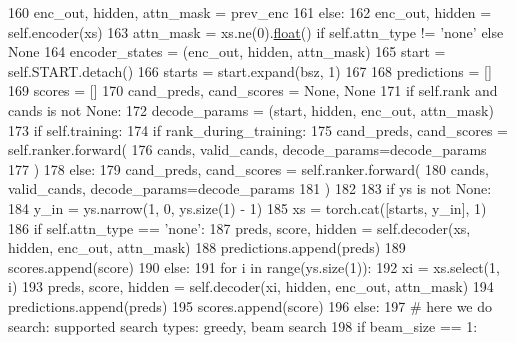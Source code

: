 \begin{DoxyCode}
160             enc\_out, hidden, attn\_mask = prev\_enc
161         \textcolor{keywordflow}{else}:
162             enc\_out, hidden = self.encoder(xs)
163             attn\_mask = xs.ne(0).\hyperlink{namespaceprojects_1_1controllable__dialogue_1_1make__control__dataset_aa2b7207688c641dbc094ab44eca27113}{float}() \textcolor{keywordflow}{if} self.attn\_type != \textcolor{stringliteral}{'none'} \textcolor{keywordflow}{else} \textcolor{keywordtype}{None}
164         encoder\_states = (enc\_out, hidden, attn\_mask)
165         start = self.START.detach()
166         starts = start.expand(bsz, 1)
167 
168         predictions = []
169         scores = []
170         cand\_preds, cand\_scores = \textcolor{keywordtype}{None}, \textcolor{keywordtype}{None}
171         \textcolor{keywordflow}{if} self.rank \textcolor{keywordflow}{and} cands \textcolor{keywordflow}{is} \textcolor{keywordflow}{not} \textcolor{keywordtype}{None}:
172             decode\_params = (start, hidden, enc\_out, attn\_mask)
173             \textcolor{keywordflow}{if} self.training:
174                 \textcolor{keywordflow}{if} rank\_during\_training:
175                     cand\_preds, cand\_scores = self.ranker.forward(
176                         cands, valid\_cands, decode\_params=decode\_params
177                     )
178             \textcolor{keywordflow}{else}:
179                 cand\_preds, cand\_scores = self.ranker.forward(
180                     cands, valid\_cands, decode\_params=decode\_params
181                 )
182 
183         \textcolor{keywordflow}{if} ys \textcolor{keywordflow}{is} \textcolor{keywordflow}{not} \textcolor{keywordtype}{None}:
184             y\_in = ys.narrow(1, 0, ys.size(1) - 1)
185             xs = torch.cat([starts, y\_in], 1)
186             \textcolor{keywordflow}{if} self.attn\_type == \textcolor{stringliteral}{'none'}:
187                 preds, score, hidden = self.decoder(xs, hidden, enc\_out, attn\_mask)
188                 predictions.append(preds)
189                 scores.append(score)
190             \textcolor{keywordflow}{else}:
191                 \textcolor{keywordflow}{for} i \textcolor{keywordflow}{in} range(ys.size(1)):
192                     xi = xs.select(1, i)
193                     preds, score, hidden = self.decoder(xi, hidden, enc\_out, attn\_mask)
194                     predictions.append(preds)
195                     scores.append(score)
196         \textcolor{keywordflow}{else}:
197             \textcolor{comment}{# here we do search: supported search types: greedy, beam search}
198             \textcolor{keywordflow}{if} beam\_size == 1:

\end{DoxyCode}

